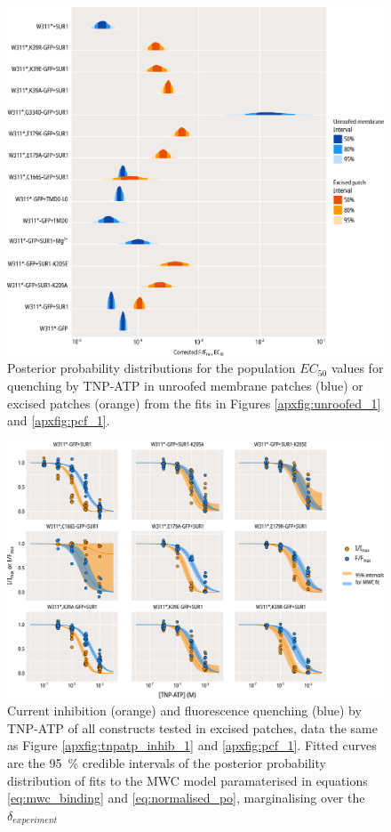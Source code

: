 \begin{figure}[h]
	\centering
	\includegraphics[width=\textwidth]{all_binding_params.pdf}
	\caption[Fluorescence quenching EC\textsubscript{50} posterior distributions]{
	Posterior probability distributions for the population $EC_{50}$ values for quenching by TNP-ATP in unroofed membrane patches (blue) or excised patches (orange) from the fits in Figures \ref{apxfig:unroofed_1} and \ref{apxfig:pcf_1}.
	}
	\label{apxfig:binding_params}
\end{figure}

\begin{figure}[h]
	\centering
	\includegraphics[width=\textwidth]{all_pcf_fits_1.pdf}
	\caption[MWC population fits]{
	Current inhibition (orange) and fluorescence quenching (blue) by TNP-ATP of all constructs tested in excised patches, data the same as Figure \ref{apxfig:tnpatp_inhib_1} and \ref{apxfig:pcf_1}.
	Fitted curves are the \SI{95}{\percent} credible intervals of the posterior probability distribution of fits to the MWC model paramaterised in equations \ref{eq:mwc_binding} and \ref{eq:normalised_po}, marginalising over the $\delta_{experiment}$
	}
	\label{apxfig:pcf_3}
\end{figure}

